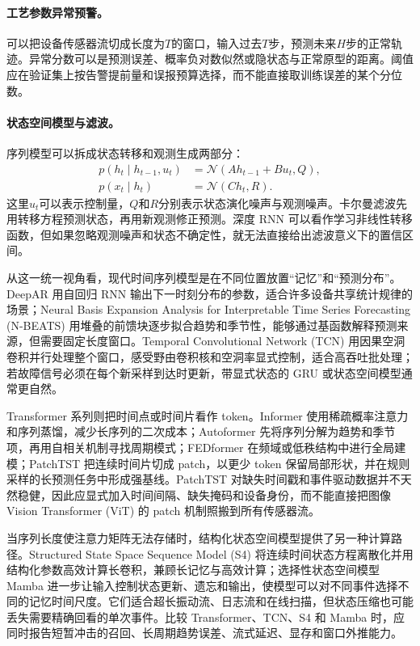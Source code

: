 \paragraph{工艺参数异常预警。}
可以把设备传感器流切成长度为$T$的窗口，输入过去$T$步，预测未来$H$步的正常轨迹。异常分数可以是预测误差、概率负对数似然或隐状态与正常原型的距离。阈值应在验证集上按告警提前量和误报预算选择，而不能直接取训练误差的某个分位数。

\paragraph{状态空间模型与滤波。}
序列模型可以拆成状态转移和观测生成两部分：
\begin{align}
 p(h_t\mid h_{t-1},u_t)&=\mathcal N(Ah_{t-1}+Bu_t,Q),\\
 p(x_t\mid h_t)&=\mathcal N(Ch_t,R).
\end{align}
这里$u_t$可以表示控制量，$Q$和$R$分别表示状态演化噪声与观测噪声。卡尔曼滤波先用转移方程预测状态，再用新观测修正预测。深度 RNN 可以看作学习非线性转移函数，但如果忽略观测噪声和状态不确定性，就无法直接给出滤波意义下的置信区间。

从这一统一视角看，现代时间序列模型是在不同位置放置“记忆”和“预测分布”。DeepAR 用自回归 RNN 输出下一时刻分布的参数，适合许多设备共享统计规律的场景；Neural Basis Expansion Analysis for Interpretable Time Series Forecasting (N-BEATS) 用堆叠的前馈块逐步拟合趋势和季节性，能够通过基函数解释预测来源，但需要固定长度窗口。Temporal Convolutional Network (TCN) 用因果空洞卷积并行处理整个窗口，感受野由卷积核和空洞率显式控制，适合高吞吐批处理；若故障信号必须在每个新采样到达时更新，带显式状态的 GRU 或状态空间模型通常更自然。

Transformer 系列则把时间点或时间片看作 token。Informer 使用稀疏概率注意力和序列蒸馏，减少长序列的二次成本；Autoformer 先将序列分解为趋势和季节项，再用自相关机制寻找周期模式；FEDformer 在频域或低秩结构中进行全局建模；PatchTST 把连续时间片切成 patch，以更少 token 保留局部形状，并在规则采样的长预测任务中形成强基线。PatchTST 对缺失时间戳和事件驱动数据并不天然稳健，因此应显式加入时间间隔、缺失掩码和设备身份，而不能直接把图像 Vision Transformer (ViT) 的 patch 机制照搬到所有传感器流。

当序列长度使注意力矩阵无法存储时，结构化状态空间模型提供了另一种计算路径。Structured State Space Sequence Model (S4) 将连续时间状态方程离散化并用结构化参数高效计算长卷积，兼顾长记忆与高效计算；选择性状态空间模型 Mamba 进一步让输入控制状态更新、遗忘和输出，使模型可以对不同事件选择不同的记忆时间尺度。它们适合超长振动流、日志流和在线扫描，但状态压缩也可能丢失需要精确回看的单次事件。比较 Transformer、TCN、S4 和 Mamba 时，应同时报告短暂冲击的召回、长周期趋势误差、流式延迟、显存和窗口外推能力。


